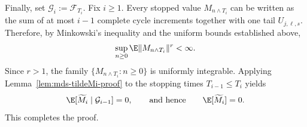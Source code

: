\documentclass[mnsc,nonblindrev]{informs3}
\begin{document}
Finally, set \(\mathcal G_i:=\mathcal F_{T_i}\). Fix \(i\ge1\). Every stopped
value \(M_{n\wedge T_i}\) can be written as the sum of at most \(i-1\) complete
cycle increments together with one tail \(U_{j,\ell,s}\). Therefore, by
Minkowski's inequality and the uniform bounds established above,
\[
\sup_{n\ge0}\E\|M_{n\wedge T_i}\|^r<\infty.
\]
Since \(r>1\), the family \(\{M_{n\wedge T_i}:n\ge0\}\) is uniformly
integrable. Applying Lemma~\ref{lem:mds-tildeMi-proof} to the stopping times
\(T_{i-1}\le T_i\) yields
\begin{equation}\label{eq:martingaledifference}
\E[\widetilde M_i\mid \mathcal G_{i-1}]=0,
\qquad\text{and hence}\qquad
\E[\widetilde M_i]=0.
\end{equation}
This completes the proof.



\end{document}
